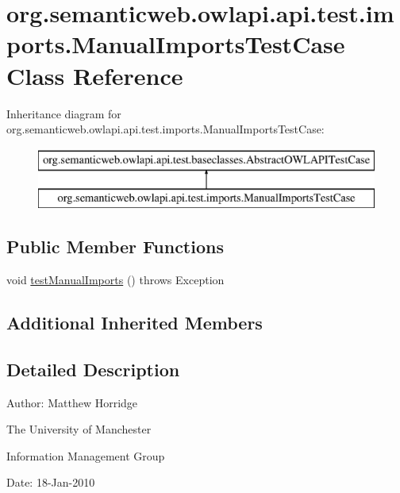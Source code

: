 \hypertarget{classorg_1_1semanticweb_1_1owlapi_1_1api_1_1test_1_1imports_1_1_manual_imports_test_case}{\section{org.\-semanticweb.\-owlapi.\-api.\-test.\-imports.\-Manual\-Imports\-Test\-Case Class Reference}
\label{classorg_1_1semanticweb_1_1owlapi_1_1api_1_1test_1_1imports_1_1_manual_imports_test_case}
}
Inheritance diagram for org.\-semanticweb.\-owlapi.\-api.\-test.\-imports.\-Manual\-Imports\-Test\-Case\-:\begin{figure}[H]
\begin{center}
\leavevmode
\includegraphics[height=2.000000cm]{classorg_1_1semanticweb_1_1owlapi_1_1api_1_1test_1_1imports_1_1_manual_imports_test_case}
\end{center}
\end{figure}
\subsection*{Public Member Functions}
\begin{DoxyCompactItemize}
\item 
void \hyperlink{classorg_1_1semanticweb_1_1owlapi_1_1api_1_1test_1_1imports_1_1_manual_imports_test_case_a84317b86a75d15de35a3afb2e3ea7d0f}{test\-Manual\-Imports} ()  throws Exception 
\end{DoxyCompactItemize}
\subsection*{Additional Inherited Members}


\subsection{Detailed Description}
Author\-: Matthew Horridge\par
 The University of Manchester\par
 Information Management Group\par
 Date\-: 18-\/\-Jan-\/2010 

